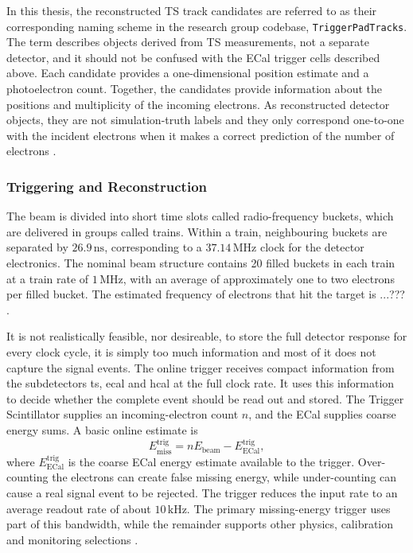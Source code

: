 In this thesis, the reconstructed TS track candidates are referred to as their corresponding naming scheme in the research group codebase,
\texttt{TriggerPadTracks}. The term describes objects derived from TS
measurements, not a separate detector, and it should not be confused with the
ECal trigger cells described above. Each candidate provides a
one-dimensional position estimate and a photoelectron count. Together, the
candidates provide information about the positions and multiplicity of the
incoming electrons. As reconstructed detector objects, they are not
simulation-truth labels and they only correspond one-to-one with the incident
electrons when it makes a correct prediction of the number of electrons \cite{ldmx2025-overview}.

\subsubsection{Triggering and Reconstruction}

The beam is divided into short time slots called radio-frequency buckets,
which are delivered in groups called trains. Within a train, neighbouring
buckets are separated by \(26.9\,\mathrm{ns}\), corresponding to a
\(37.14\,\mathrm{MHz}\) clock for the detector electronics. The nominal beam
structure contains 20 filled buckets in each train at a train rate of
\(1\,\mathrm{MHz}\), with an average of approximately one to two electrons
per filled bucket. The estimated frequency of electrons that hit the target is ...??? \cite{ldmx2025-overview}.

It is not realistically feasible, nor desireable, to store the full detector response for
every clock cycle, it is simply too much information and most of it does not capture the signal events. The online trigger receives compact information from the subdetectors
\gls{ts}, \gls{ecal} and \gls{hcal} at the full clock rate. It uses this
information to decide whether the complete event should be read out and
stored. The Trigger Scintillator supplies an incoming-electron count \(n\),
and the ECal supplies coarse energy sums. A basic online estimate is
\begin{equation}
    E_{\mathrm{miss}}^{\mathrm{trig}}
    =
    nE_{\mathrm{beam}} - E_{\mathrm{ECal}}^{\mathrm{trig}} ,
\end{equation}
where \(E_{\mathrm{ECal}}^{\mathrm{trig}}\) is the coarse ECal energy estimate
available to the trigger.
Over-counting the electrons can create false missing energy, while
under-counting can cause a real signal event to be rejected. The trigger
reduces the input rate to an average readout rate of about
\(10\,\mathrm{kHz}\). The primary missing-energy trigger uses part of this
bandwidth, while the remainder supports other physics, calibration and
monitoring selections \cite{ldmx2025-overview}.

